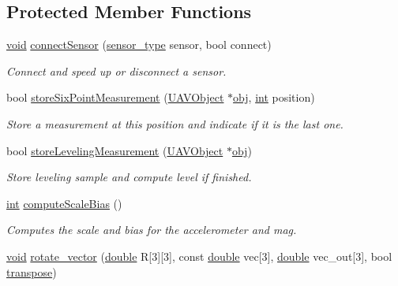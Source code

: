\subsection*{Protected Member Functions}
\begin{DoxyCompactItemize}
\item 
\hyperlink{group___u_a_v_objects_plugin_ga444cf2ff3f0ecbe028adce838d373f5c}{void} \hyperlink{class_calibration_a136ee34ff849bbeb76c30cd543e7419b}{connect\-Sensor} (\hyperlink{class_calibration_ab4af1e75c9a40776a4c5ed1da5e7caf8}{sensor\-\_\-type} sensor, bool connect)
\begin{DoxyCompactList}\small\item\em Connect and speed up or disconnect a sensor. \end{DoxyCompactList}\item 
bool \hyperlink{class_calibration_accd918a485a64e4d0f751050f84e660a}{store\-Six\-Point\-Measurement} (\hyperlink{class_u_a_v_object}{U\-A\-V\-Object} $\ast$\hyperlink{glext_8h_a0c0d4701a6c89f4f7f0640715d27ab26}{obj}, \hyperlink{ioapi_8h_a787fa3cf048117ba7123753c1e74fcd6}{int} position)
\begin{DoxyCompactList}\small\item\em Store a measurement at this position and indicate if it is the last one. \end{DoxyCompactList}\item 
bool \hyperlink{class_calibration_a2a04c8742b7da61b9b835b43d114fcd4}{store\-Leveling\-Measurement} (\hyperlink{class_u_a_v_object}{U\-A\-V\-Object} $\ast$\hyperlink{glext_8h_a0c0d4701a6c89f4f7f0640715d27ab26}{obj})
\begin{DoxyCompactList}\small\item\em Store leveling sample and compute level if finished. \end{DoxyCompactList}\item 
\hyperlink{ioapi_8h_a787fa3cf048117ba7123753c1e74fcd6}{int} \hyperlink{class_calibration_aae10034ae031c64a977309fed00e7a91}{compute\-Scale\-Bias} ()
\begin{DoxyCompactList}\small\item\em Computes the scale and bias for the accelerometer and mag. \end{DoxyCompactList}\item 
\hyperlink{group___u_a_v_objects_plugin_ga444cf2ff3f0ecbe028adce838d373f5c}{void} \hyperlink{class_calibration_a5b519d85bb3e530d25b595bad5a926d7}{rotate\-\_\-vector} (\hyperlink{_super_l_u_support_8h_a8956b2b9f49bf918deed98379d159ca7}{double} R\mbox{[}3\mbox{]}\mbox{[}3\mbox{]}, const \hyperlink{_super_l_u_support_8h_a8956b2b9f49bf918deed98379d159ca7}{double} vec\mbox{[}3\mbox{]}, \hyperlink{_super_l_u_support_8h_a8956b2b9f49bf918deed98379d159ca7}{double} vec\-\_\-out\mbox{[}3\mbox{]}, bool \hyperlink{glext_8h_a7ad291818ab127e386dec37f7e1bdb97}{transpose})

\end{DoxyCompactItemize}
